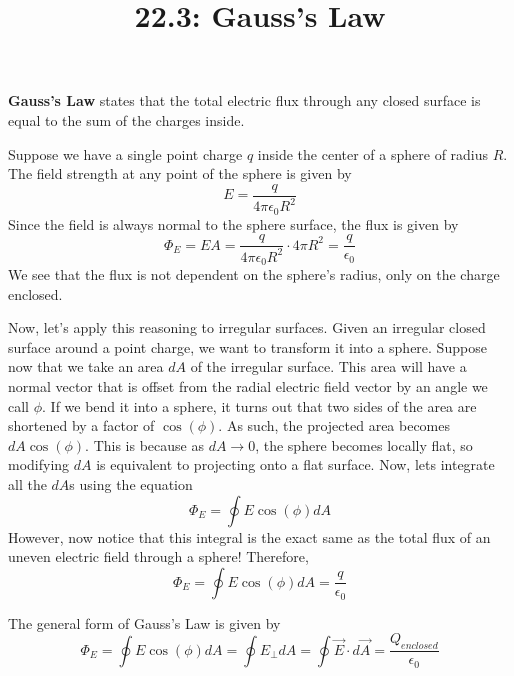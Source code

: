 \documentclass{article}
\title{22.3: Gauss's Law}
\begin{document}
\maketitle

\begin{definition}
\textbf{Gauss's Law} states that the total electric flux through any closed surface is equal to the sum of the charges inside.  
\end{definition}

\begin{example}
Suppose we have a single point charge $q$ inside the center of a sphere of radius $R$. The field strength at any point of the sphere is given by $$E = \frac{q}{4\pi\epsilon_0R^2}$$Since the field is always normal to the sphere surface, the flux is given by $$\Phi_E = EA = \frac{q}{4\pi\epsilon_0R^2} \cdot 4\pi R^2 =  \frac{q}{\epsilon_0}$$We see that the flux is not dependent on the sphere's radius, only on the charge enclosed.
\end{example}

\begin{example}
Now, let's apply this reasoning to irregular surfaces. Given an irregular closed surface around a point charge, we want to transform it into a sphere. Suppose now that we take an area $dA$ of the irregular surface. This area will have a normal vector that is offset from the radial electric field vector by an angle we call $\phi$. If we bend it into a sphere, it turns out that two sides of the area are shortened by a factor of $\cos(\phi)$. As such, the projected area becomes $dA\cos(\phi)$. This is because as $dA \to 0$, the sphere becomes locally flat, so modifying $dA$ is equivalent to projecting onto a flat surface. Now, lets integrate all the $dA$s using the equation $$\Phi_E = \oint E\cos(\phi) dA$$However, now notice that this integral is the exact same as the total flux of an uneven electric field through a sphere! Therefore, $$\Phi_E = \oint E\cos(\phi)dA = \frac{q}{\epsilon_0}$$
\end{example}

The general form of Gauss's Law is given by $$\Phi_E = \oint E\cos(\phi)dA = \oint E_\perp dA = \oint \vec{E} \cdot d\vec{A} = \frac{Q_{enclosed}}{\epsilon_0}$$
\end{document}
